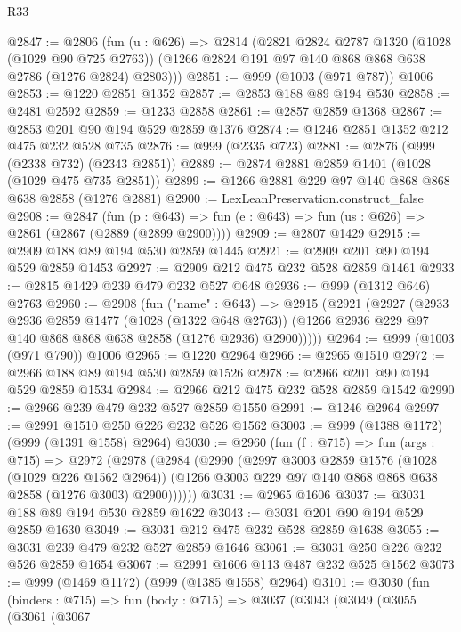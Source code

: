 \begin{lexlean}{R33}
\begin{coremodule}
@2847 := @2806
    (fun (u : @626) =>
    @2814
      (@2821
        @2824
        @2787
        @1320
        (@1028 (@1029 @90 @725 @2763))
        (@1266 @2824 @191 @97 @140 @868 @868 @638 @2786 (@1276 @2824) @2803)))
@2851 := @999 (@1003 (@971 @787)) @1006
@2853 := @1220 @2851 @1352
@2857 := @2853 @188 @89 @194 @530
@2858 := @2481 @2592
@2859 := @1233 @2858
@2861 := @2857 @2859 @1368
@2867 := @2853 @201 @90 @194 @529 @2859 @1376
@2874 := @1246 @2851 @1352 @212 @475 @232 @528 @735
@2876 := @999 (@2335 @723)
@2881 := @2876 (@999 (@2338 @732) (@2343 @2851))
@2889 := @2874 @2881 @2859 @1401 (@1028 (@1029 @475 @735 @2851))
@2899 := @1266 @2881 @229 @97 @140 @868 @868 @638 @2858 (@1276 @2881)
@2900 := LexLeanPreservation.construct_false
@2908 := @2847
    (fun (p : @643) => fun (e : @643) => fun (us : @626) => @2861 (@2867 (@2889 (@2899 @2900))))
@2909 := @2807 @1429
@2915 := @2909 @188 @89 @194 @530 @2859 @1445
@2921 := @2909 @201 @90 @194 @529 @2859 @1453
@2927 := @2909 @212 @475 @232 @528 @2859 @1461
@2933 := @2815 @1429 @239 @479 @232 @527 @648
@2936 := @999 (@1312 @646) @2763
@2960 := @2908
    (fun ("name" : @643) =>
    @2915
      (@2921
        (@2927
          (@2933
            @2936
            @2859
            @1477
            (@1028 (@1322 @648 @2763))
            (@1266 @2936 @229 @97 @140 @868 @868 @638 @2858 (@1276 @2936) @2900)))))
@2964 := @999 (@1003 (@971 @790)) @1006
@2965 := @1220 @2964
@2966 := @2965 @1510
@2972 := @2966 @188 @89 @194 @530 @2859 @1526
@2978 := @2966 @201 @90 @194 @529 @2859 @1534
@2984 := @2966 @212 @475 @232 @528 @2859 @1542
@2990 := @2966 @239 @479 @232 @527 @2859 @1550
@2991 := @1246 @2964
@2997 := @2991 @1510 @250 @226 @232 @526 @1562
@3003 := @999 (@1388 @1172) (@999 (@1391 @1558) @2964)
@3030 := @2960
    (fun (f : @715) =>
    fun (args : @715) =>
    @2972
      (@2978
        (@2984
          (@2990
            (@2997
              @3003
              @2859
              @1576
              (@1028 (@1029 @226 @1562 @2964))
              (@1266 @3003 @229 @97 @140 @868 @868 @638 @2858 (@1276 @3003) @2900))))))
@3031 := @2965 @1606
@3037 := @3031 @188 @89 @194 @530 @2859 @1622
@3043 := @3031 @201 @90 @194 @529 @2859 @1630
@3049 := @3031 @212 @475 @232 @528 @2859 @1638
@3055 := @3031 @239 @479 @232 @527 @2859 @1646
@3061 := @3031 @250 @226 @232 @526 @2859 @1654
@3067 := @2991 @1606 @113 @487 @232 @525 @1562
@3073 := @999 (@1469 @1172) (@999 (@1385 @1558) @2964)
@3101 := @3030
    (fun (binders : @715) =>
    fun (body : @715) =>
    @3037
      (@3043
        (@3049
          (@3055
            (@3061
              (@3067

\end{coremodule}
\end{lexlean}
